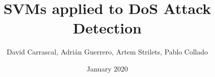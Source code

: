 \documentclass[12pt]{report}
\title{SVMs applied to DoS Attack Detection}
\author{David Carrascal, Adrián Guerrero, Artem Strilets, Pablo Collado}
\date{January 2020}
\begin{document}
    \begin{titlepage}
        \maketitle
    \end{titlepage}


    \begin{markdown}
        
    \end{markdown}
    
\end{document}
